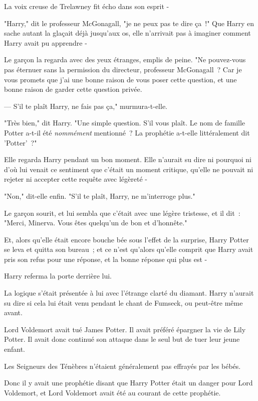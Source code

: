 La voix creuse de Trelawney fit écho dans son esprit -

"Harry," dit le professeur McGonagall, "je ne peux pas te dire ça~!" Que Harry en sache autant la glaçait déjà jusqu'aux os, elle n'arrivait pas à imaginer comment Harry avait pu apprendre -

Le garçon la regarda avec des yeux étranges, emplis de peine. "Ne pouvez-vous pas éternuer sans la permission du directeur, professeur McGonagall~? Car je vous promets que j'ai une bonne raison de vous poser cette question, et une bonne raison de garder cette question privée.

--- S'il te plaît Harry, ne fais pas ça," murmura-t-elle.

"Très bien," dit Harry. "Une simple question. S'il vous plaît. Le nom de famille Potter a-t-il été \emph{nommément} mentionné~? La prophétie a-t-elle littéralement dit 'Potter'~?"

Elle regarda Harry pendant un bon moment. Elle n'aurait su dire ni pourquoi ni d'où lui venait ce sentiment que c'était un moment critique, qu'elle ne pouvait ni rejeter ni accepter cette requête avec légèreté -

"Non," dit-elle enfin. "S'il te plaît, Harry, ne m'interroge plus."

Le garçon sourit, et lui sembla que c'était avec une légère tristesse, et il dit~: "Merci, Minerva. Vous êtes quelqu'un de bon et d'honnête."

Et, alors qu'elle était encore bouche bée sous l'effet de la surprise, Harry Potter se leva et quitta son bureau~; et ce n'est qu'alors qu'elle comprit que Harry avait pris son refus pour une réponse, et la bonne réponse qui plus est -

Harry referma la porte derrière lui.

La logique s'était présentée à lui avec l'étrange clarté du diamant. Harry n'aurait su dire si cela lui était venu pendant le chant de Fumseck, ou peut-être même avant.

Lord Voldemort avait tué James Potter. Il avait préféré épargner la vie de Lily Potter. Il avait donc continué son attaque dans le seul but de tuer leur jeune enfant.

Les Seigneurs des Ténèbres n'étaient généralement pas effrayés par les bébés.

Donc il y avait une prophétie disant que Harry Potter était un danger pour Lord Voldemort, et Lord Voldemort avait été au courant de cette prophétie.

